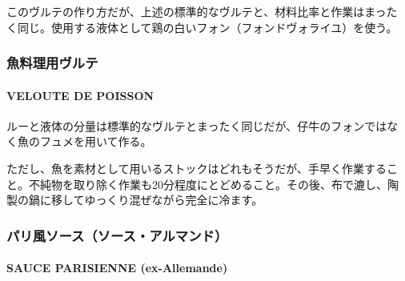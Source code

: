 \begin{recette}
このヴルテの作り方だが、上述の標準的なヴルテと、材料比率と作業はまった
く同じ。使用する液体として鶏の白いフォン（フォンドヴォライユ）を使う。

\maeaki

\hypertarget{ux9b5aux6599ux7406ux7528ux30f4ux30ebux30c6}{%
\subsubsection{魚料理用ヴルテ}\label{ux9b5aux6599ux7406ux7528ux30f4ux30ebux30c6}}

\hypertarget{veloute-de-poisson}{%
\paragraph{VELOUTE DE POISSON}\label{veloute-de-poisson}}

   

ルーと液体の分量は標準的なヴルテとまったく同じだが、仔牛のフォンではな
く魚のフュメを用いて作る。

ただし、魚を素材として用いるストックはどれもそうだが、手早く作業するこ
と。不純物を取り除く作業も20分程度にとどめること。その後、布で漉し、陶
製の鍋に移してゆっくり混ぜながら完全に冷ます。

\maeaki

\hypertarget{ux30d1ux30eaux98a8ux30bdux30fcux30b9ux30bdux30fcux30b9ux30a2ux30ebux30deux30f3ux30c9}{%
\subsubsection{パリ風ソース（ソース・アルマンド）}\label{ux30d1ux30eaux98a8ux30bdux30fcux30b9ux30bdux30fcux30b9ux30a2ux30ebux30deux30f3ux30c9}}

\hypertarget{sauce-allemande}{%
\paragraph{SAUCE PARISIENNE (ex-Allemande)}\label{sauce-allemande}}

  
 


\end{recette}
